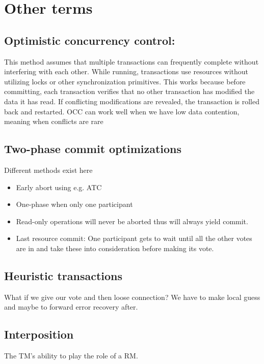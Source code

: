 \section{Other terms}
\subsection{Optimistic concurrency control:}
This method assumes that multiple transactions can frequently complete without interfering with each other. While running, transactions use resources without utilizing locks or other synchronization primitives. This works because before committing, each transaction verifies that no other transaction has modified the data it has read. If conflicting modifications are revealed, the transaction is rolled back and restarted. OCC can work well when we have low data contention, meaning when conflicts are rare

\subsection{Two-phase commit optimizations}
Different methods exist here
\begin{itemize}
\item Early abort using e.g. ATC
\item One-phase when only one participant
\item Read-only operations will never be aborted thus will always yield commit.
\item Last resource commit: One participant gets to wait until all the other votes are in and take these into consideration before making its vote.
\end{itemize}

\subsection{Heuristic transactions}
What if we give our vote and then loose connection? We have to make local guess and maybe to forward error recovery after.

\subsection{Interposition}
The TM's ability to play the role of a RM.

